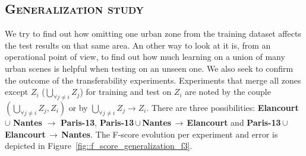     \subsection{\textsc{Generalization study}}
        \label{subsec::more_experiments::scalability::generalization}
        We try to find out how omitting one urban zone from the training dataset affects the test results on that same area.
        An other way to look at it is, from an operational point of view, to find out how much learning on a union of many urban scenes is helpful when testing on an unseen one.
        We also seek to confirm the outcome of the transferability experiments.
        Experiments that merge all zones except $Z_i$ ($\underset{\forall j \neq i}{\bigcup} Z_j$) for training and test on $Z_i$ are noted by the couple $(\underset{\forall j \neq i}{\bigcup} Z_j, Z_i)$ or by $ \underset{\forall j \neq i}{\bigcup} Z_j \rightarrow Z_i$.
        There are three possibilities: \textbf{Elancourt} $\cup$ \textbf{Nantes} $\rightarrow$ \textbf{Paris-13}, \mbox{\textbf{Paris-13}}\,$\cup$\,\textbf{Nantes}\,$\rightarrow$\,\textbf{Elancourt} and \mbox{\textbf{Paris-13}}\,$\cup$\,\textbf{Elancourt}\,$\rightarrow$\,\textbf{Nantes}.
        The F-score evolution per experiment and error is depicted in Figure~\ref{fig::f_score_generalization_f3}.\\
    
        \begin{figure}[htbp]
        \end{figure}

